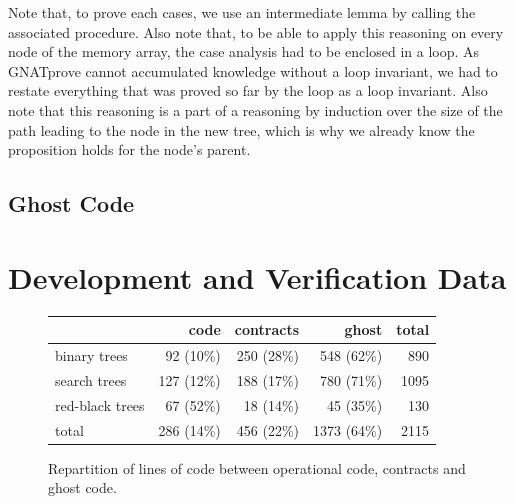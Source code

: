 \documentclass[11pt,a4paper]{article}
\newcommand{\gnatprove}{GNATprove\xspace}
\begin{document}
Note that, to prove each cases, we use an intermediate lemma by calling the associated procedure.
Also note that, to be able to apply this reasoning on every node of the memory array, the case
analysis had to be enclosed in a loop. As \gnatprove cannot accumulated knowledge without a loop
invariant, we had to restate everything that was proved so far by the loop as a loop invariant.
Also note that this reasoning is a part of a reasoning by induction over the size of the path
leading to the node in the new tree, which is why we already know the proposition holds for the
node's parent.

\subsection{Ghost Code}



\section{Development and Verification Data}

\begin{figure}[ht]
\begin{center}
\begin{tabular}{l|rrr|r}
                & code       & contracts  &      ghost  & total \\ \hline
binary trees    & 92  (10\%) & 250 (28\%) & 548  (62\%) & 890 \\
search trees    & 127 (12\%) & 188 (17\%) & 780  (71\%) & 1095 \\
red-black trees & 67  (52\%) & 18  (14\%) & 45   (35\%) & 130 \\ \hline
total           & 286 (14\%) & 456 (22\%) & 1373 (64\%) & 2115 \\
\end{tabular}
\caption{\label{tab-sloc} Repartition of lines of code between operational code, contracts and ghost code.}
\end{center}
\end{figure}
\end{document}
